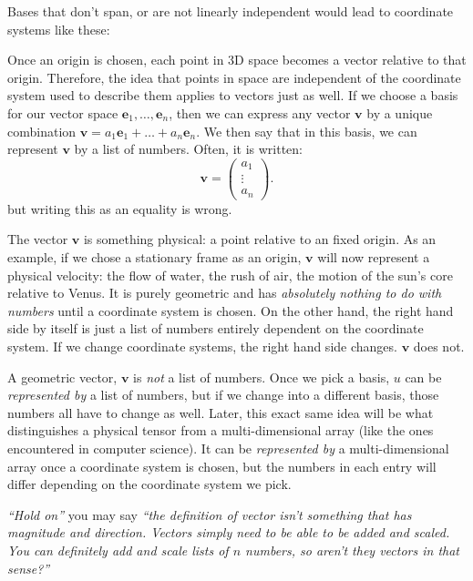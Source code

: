 \documentclass[../master.tex]{subfiles}
\begin{document}
	Bases that don't span, or are not linearly independent would lead to coordinate systems like these:
	

	Once an origin is chosen, each point in 3D space becomes a vector relative to that origin. Therefore, the idea that points in space are independent of the coordinate system used to describe them applies to vectors just as well. If we choose a basis for our vector space $\mathbf e_1, \dots, \mathbf e_n$, then we can express any vector $\mathbf v$ by a unique combination $\mathbf v = a_1 \mathbf e_1 + \dots + a_n \mathbf e_n$. We then say that in this basis, we can represent $\mathbf v$ by a list of numbers. Often, it is written:
	\begin{equation*}
		\mathbf v = \begin{pmatrix} a_1 \\ \vdots \\a_n	\end{pmatrix}.
	\end{equation*}
	but writing this as an equality is wrong. 
	
	The vector $\mathbf v$ is something physical: a point relative to an fixed origin. As an example, if we chose a stationary frame as an origin, $\mathbf v$ will now represent a physical velocity: the flow of water, the rush of air, the motion of the sun's core relative to Venus. It is purely geometric and has \emph{absolutely nothing to do with numbers} until a coordinate system is chosen. On the other hand, the right hand side by itself is just a list of numbers entirely dependent on the coordinate system. If we change coordinate systems, the right hand side changes. $\mathbf v$ does not.
	
	A geometric vector, $\mathbf v$ is \emph{not} a list of numbers. Once we pick a basis, $u$ can be \emph{represented by} a list of numbers, but if we change into a different basis, those numbers all have to change as well. Later, this exact same idea will be what distinguishes a physical tensor from a multi-dimensional array (like the ones encountered in computer science). It can be \emph{represented by} a multi-dimensional array once a coordinate system is chosen, but the numbers in each entry will differ depending on the coordinate system we pick. 
	
	\emph{``Hold on''} you may say \emph{``the definition of vector isn't something that has magnitude and direction. Vectors simply need to be able to be added and scaled. You can definitely add and scale lists of $n$ numbers, so aren't they vectors in that sense?''}
	
\end{document}
